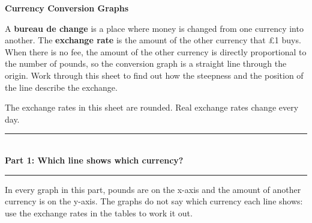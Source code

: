 \documentclass[12pt,a4paper]{article}
\newcommand{\heading}[1]{%
  \vspace{2pt}
  {\color{blue!45!black}\rule{\linewidth}{1pt}}\\[1pt]
  {\large\bfseries #1}\\[-6pt]
  {\color{blue!45!black}\rule{\linewidth}{0.4pt}}
  \vspace{2pt}}
\newcommand{\parttitle}[2]{\heading{Part #1: #2}}
\begin{document}
\begin{center}
  {\Large\bfseries Currency Conversion Graphs}\\[8pt]
\end{center}
\vspace{1pt}

\begin{keyidea}
\small
A \textbf{bureau de change} is a place where money is changed from one
currency into another. The \textbf{exchange rate} is the amount of the other
currency that \pounds1 buys. When there is no fee, the amount of the other
currency is directly proportional to the number of pounds, so the conversion
graph is a straight line through the origin. Work through this sheet to find
out how the steepness and the position of the line describe the exchange.

\smallskip
The exchange rates in this sheet are rounded. Real exchange rates change every
day.
\end{keyidea}

\parttitle{1}{Which line shows which currency?}

In every graph in this part, pounds are on the x-axis and the amount of
another currency is on the y-axis. The graphs do not say which currency each
line shows: use the exchange rates in the tables to work it out.
\end{document}
